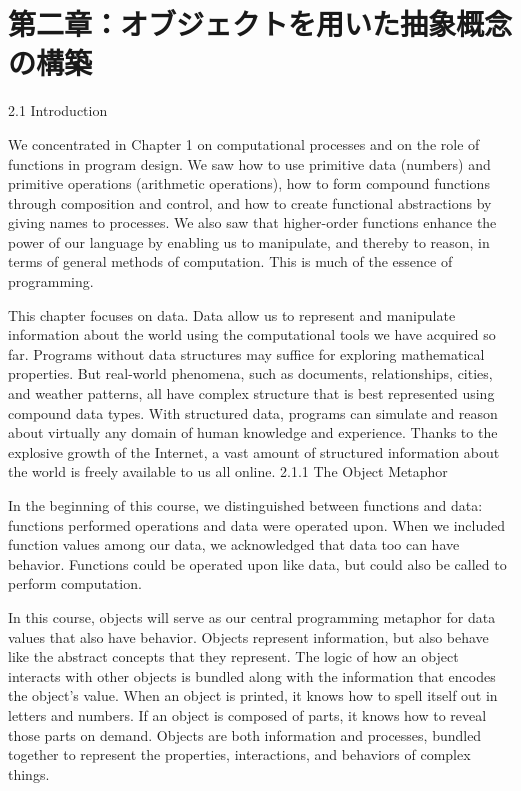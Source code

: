 \documentclass[letterpaper,10pt,dvipdfmx]{sphinxmanual}
\begin{document}
\chapter{第二章：オブジェクトを用いた抽象概念の構築}
\label{objects::doc}\label{objects:id1}
2.1   Introduction

We concentrated in Chapter 1 on computational processes and on the role of functions in program design. We saw how to use primitive data (numbers) and primitive operations (arithmetic operations), how to form compound functions through composition and control, and how to create functional abstractions by giving names to processes. We also saw that higher-order functions enhance the power of our language by enabling us to manipulate, and thereby to reason, in terms of general methods of computation. This is much of the essence of programming.

This chapter focuses on data. Data allow us to represent and manipulate information about the world using the computational tools we have acquired so far. Programs without data structures may suffice for exploring mathematical properties. But real-world phenomena, such as documents, relationships, cities, and weather patterns, all have complex structure that is best represented using compound data types. With structured data, programs can simulate and reason about virtually any domain of human knowledge and experience. Thanks to the explosive growth of the Internet, a vast amount of structured information about the world is freely available to us all online.
2.1.1   The Object Metaphor

In the beginning of this course, we distinguished between functions and data: functions performed operations and data were operated upon. When we included function values among our data, we acknowledged that data too can have behavior. Functions could be operated upon like data, but could also be called to perform computation.

In this course, objects will serve as our central programming metaphor for data values that also have behavior. Objects represent information, but also behave like the abstract concepts that they represent. The logic of how an object interacts with other objects is bundled along with the information that encodes the object's value. When an object is printed, it knows how to spell itself out in letters and numbers. If an object is composed of parts, it knows how to reveal those parts on demand. Objects are both information and processes, bundled together to represent the properties, interactions, and behaviors of complex things.
\end{document}
